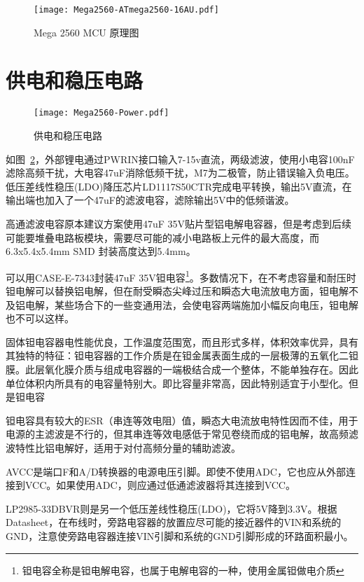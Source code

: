 \begin{figure}[htbp]
    \centering
    \texttt{[image: Mega2560-ATmega2560-16AU.pdf]}
    \caption{Mega 2560 MCU 原理图}
    \label{fig:Mega2560-ATmega2560-16AU}
\end{figure}

\section{供电和稳压电路}

\begin{figure}[htbp]
    \centering
    \texttt{[image: Mega2560-Power.pdf]}
    \caption{供电和稳压电路}
    \label{fig:Mega2560-Power}
\end{figure}

如图~\ref{fig:Mega2560-Power}，外部锂电通过PWRIN接口输入7-15v直流，两级滤波，使用小电容100nF滤除高频干扰，大电容47uF消除低频干扰，M7为二极管，防止错误输入负电压。低压差线性稳压(LDO)降压芯片LD1117S50CTR完成电平转换，输出5V直流，在输出端也加入了一个47uF的滤波电容，滤除输出5V中的低频谐波。

高通滤波电容原本建议方案使用47uF 35V贴片型铝电解电容器，但是考虑到后续可能要堆叠电路板模块，需要尽可能的减小电路板上元件的最大高度，而6.3x5.4x5.4mm SMD 封装高度达到5.4mm。

可以用CASE-E-7343封装47uF 35V钽电容\footnote{钽电容全称是钽电解电容，也属于电解电容的一种，使用金属钽做电介质}。多数情况下，在不考虑容量和耐压时钽电解可以替换铝电解，但在耐受瞬态尖峰过压和瞬态大电流放电方面，钽电解不及铝电解，某些场合下的一些变通用法，会使电容两端施加小幅反向电压，钽电解也不可以这样。

固体钽电容器电性能优良，工作温度范围宽，而且形式多样，体积效率优异，具有其独特的特征：钽电容器的工作介质是在钽金属表面生成的一层极薄的五氧化二钽膜。此层氧化膜介质与组成电容器的一端极结合成一个整体，不能单独存在。因此单位体积内所具有的电容量特别大。即比容量非常高，因此特别适宜于小型化。但是钽电容

钽电容具有较大的ESR（串连等效电阻）值，瞬态大电流放电特性因而不佳，用于电源的主滤波是不行的，但其串连等效电感低于常见卷绕而成的铝电解，故高频滤波特性比铝电解好，适用于对付高频分量的辅助滤波。

AVCC是端口F和A/D转换器的电源电压引脚。即使不使用ADC，它也应从外部连接到VCC。如果使用ADC，则应通过低通滤波器将其连接到VCC。

LP2985-33DBVR则是另一个低压差线性稳压(LDO)，它将5V降到3.3V。根据Datasheet，在布线时，旁路电容器的放置应尽可能的接近器件的VIN和系统的GND，注意使旁路电容器连接VIN引脚和系统的GND引脚形成的环路面积最小。

